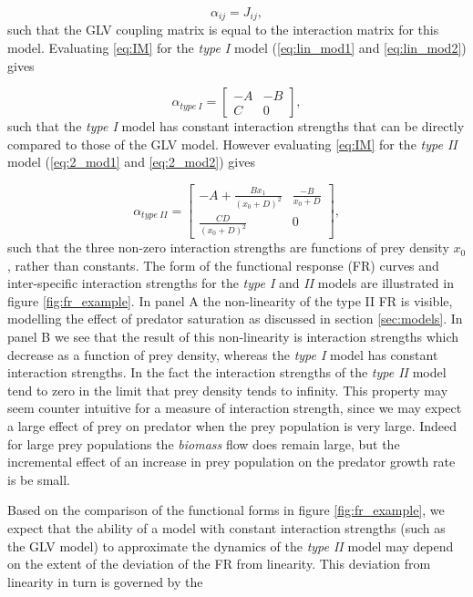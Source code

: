 \begin{equation}
\alpha_{ij} = J_{ij},
\label{eq:alpha_glv}
\end{equation}
% 
such that the GLV coupling matrix is equal to the interaction matrix for this model. Evaluating \eqref{eq:IM} for the \emph{type I} model (\ref{eq:lin_mod1} and \ref{eq:lin_mod2}) gives

\begin{equation}
\alpha_{type\ I} = 
\begin{bmatrix}
-A & -B \\ C & 0
\end{bmatrix}  	,
\end{equation}
%
such that the \emph{type I} model has constant interaction strengths that can be directly compared to those of the GLV model. However evaluating \eqref{eq:IM} for the \emph{type II} model (\ref{eq:2_mod1} and \ref{eq:2_mod2}) gives

\begin{equation}
\alpha_{type\ II} = 
\begin{bmatrix}
-A + \frac{Bx_1}{(x_0 + D)^2} & \frac{-B}{x_0 + D} \\[10pt] \frac{CD}{(x_0 + D)^2} & 0
\end{bmatrix}  	,
\end{equation}
%
such that the three non-zero interaction strengths are functions of prey density $x_0$, rather than constants. The form of the functional response (FR) curves and inter-specific interaction strengths for the \emph{type I} and \emph{II} models are illustrated in figure \ref{fig:fr_example}. In panel A the non-linearity of the type II FR is visible, modelling the effect of predator saturation as discussed in section \ref{sec:models}. In panel B we see that the result of this non-linearity is interaction strengths which decrease as a function of prey density, whereas the \emph{type I} model has constant interaction strengths. In the fact the interaction strengths of the \emph{type II} model tend to zero in the limit that prey density tends to infinity. This property may seem counter intuitive for a measure of interaction strength, since we may expect a large effect of prey on predator when the prey population is very large. Indeed for large prey populations the \emph{biomass} flow does remain large, but the incremental effect of an increase in prey population on the predator growth rate is be small.

Based on the comparison of the functional forms in figure \ref{fig:fr_example}, we expect that the ability of a model with constant interaction strengths (such as the GLV model) to approximate the dynamics of the \emph{type II} model may depend on the extent of the deviation of the FR from linearity. This deviation from linearity in turn is governed by the  

